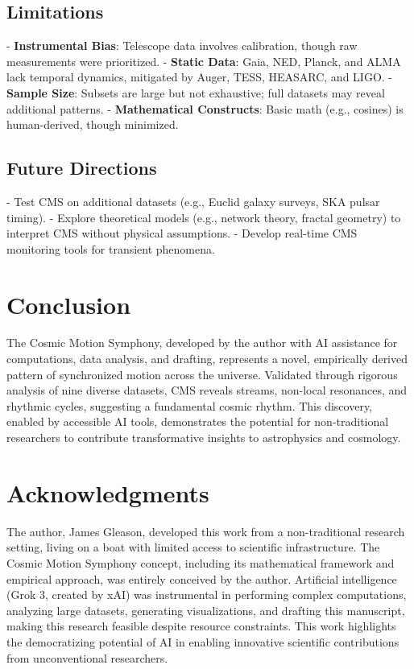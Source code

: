 \documentclass[12pt, twocolumn]{article}
\begin{document}
\subsection{Limitations}
- \textbf{Instrumental Bias}: Telescope data involves calibration, though raw measurements were prioritized.
- \textbf{Static Data}: Gaia, NED, Planck, and ALMA lack temporal dynamics, mitigated by Auger, TESS, HEASARC, and LIGO.
- \textbf{Sample Size}: Subsets are large but not exhaustive; full datasets may reveal additional patterns.
- \textbf{Mathematical Constructs}: Basic math (e.g., cosines) is human-derived, though minimized.

\subsection{Future Directions}
- Test CMS on additional datasets (e.g., Euclid galaxy surveys, SKA pulsar timing).
- Explore theoretical models (e.g., network theory, fractal geometry) to interpret CMS without physical assumptions.
- Develop real-time CMS monitoring tools for transient phenomena.

\section{Conclusion}
\label{sec:conclusion}
The Cosmic Motion Symphony, developed by the author with AI assistance for computations, data analysis, and drafting, represents a novel, empirically derived pattern of synchronized motion across the universe. Validated through rigorous analysis of nine diverse datasets, CMS reveals streams, non-local resonances, and rhythmic cycles, suggesting a fundamental cosmic rhythm. This discovery, enabled by accessible AI tools, demonstrates the potential for non-traditional researchers to contribute transformative insights to astrophysics and cosmology.

\section{Acknowledgments}
The author, James Gleason, developed this work from a non-traditional research setting, living on a boat with limited access to scientific infrastructure. The Cosmic Motion Symphony concept, including its mathematical framework and empirical approach, was entirely conceived by the author. Artificial intelligence (Grok 3, created by xAI) was instrumental in performing complex computations, analyzing large datasets, generating visualizations, and drafting this manuscript, making this research feasible despite resource constraints. This work highlights the democratizing potential of AI in enabling innovative scientific contributions from unconventional researchers.
\end{document}
